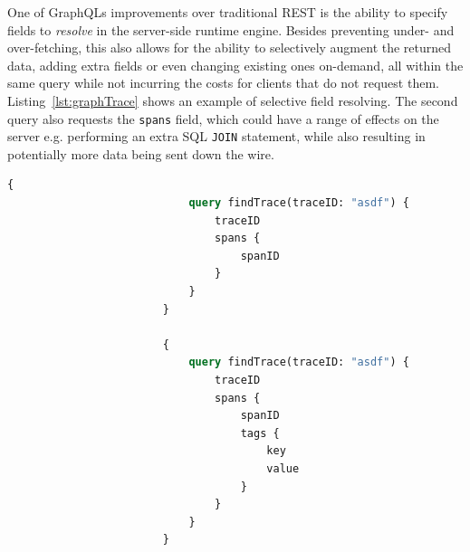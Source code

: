\documentclass[12pt,pdftex,titlepage]{report}
\begin{document}
                    One of GraphQLs improvements over traditional REST is the ability to specify fields to \textit{resolve} in the server-side runtime engine. Besides preventing
                    under- and over-fetching, this also allows for the ability to selectively augment the returned data, adding extra fields or even changing existing ones on-demand,
                    all within the same query while not incurring the costs for clients that do not request them. Listing~\ref{lst:graphTrace} shows an example of selective field
                    resolving. The second query also requests the \texttt{spans} field, which could have a range of effects on the server e.g. performing an extra SQL \texttt{JOIN}
                    statement, while also resulting in potentially more data being sent down the wire.

                    \medskip
                    \begin{lstlisting}[caption={GraphQL query to fetch a trace object and the span ID of each of its spans vs a query to fetch the trace object, its spans and every
                        tag of every span.}, label={lst:graphTrace}, language=GraphQL, gobble=24]
                        {
                            query findTrace(traceID: "asdf") {
                                traceID
                                spans {
                                    spanID
                                }
                            }
                        }

                        {
                            query findTrace(traceID: "asdf") {
                                traceID
                                spans {
                                    spanID
                                    tags {
                                        key
                                        value
                                    }
                                }
                            }
                        }
                    \end{lstlisting}
\end{document}
